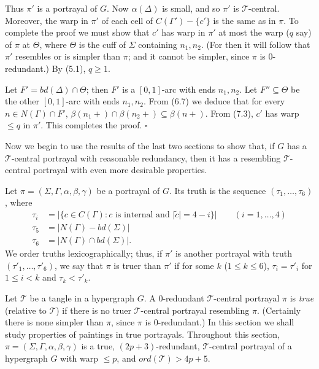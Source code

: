Thus $\pi'$ is a portrayal of $G$. Now $\alpha(\Delta)$ is small, and so $\pi'$ is $\mathcal{T}$-central. Moreover, the warp in $\pi'$ of each cell of $C(\Gamma') - \{c'\}$ is the same as in $\pi$. To complete the proof we must show that $c'$ has warp in $\pi'$ at most the warp ($q$ say) of $\pi$ at $\Theta$, where $\Theta$ is the cuff of $\Sigma$ containing $n_1, n_2$. (For then it will follow that $\pi'$ resembles or is simpler than $\pi$; and it cannot be simpler, since $\pi$ is $0$-redundant.) By (5.1), $q \ge 1$.

Let $F' = bd(\Delta) \cap \Theta$; then $F'$ is a $[0, 1]$-arc with ends $n_1, n_2$. Let $F'' \subseteq \Theta$ be the other $[0, 1]$-arc with ends $n_1, n_2$. From (6.7) we deduce that for every $n \in N(\Gamma) \cap F'$, $\beta(n_1+) \cap \beta(n_2+) \subseteq \beta(n+)$. From (7.3), $c'$ has warp $\le q$ in $\pi'$. This completes the proof. $\square$


Now we begin to use the results of the last two sections to show that, if $G$ has a $\mathcal{T}$-central portrayal with reasonable redundancy, then it has a resembling $\mathcal{T}$-central portrayal with even more desirable properties.

Let $\pi = (\Sigma, \Gamma, \alpha, \beta, \gamma)$ be a portrayal of $G$. Its truth is the sequence $(\tau_1, \dots, \tau_6)$, where
\begin{align*}
\tau_i &= |\{c \in C(\Gamma): c \text{ is internal and } |\tilde{c}| = 4 - i\}| \qquad (i = 1, \dots, 4) \\
\tau_5 &= |N(\Gamma) - bd(\Sigma)| \\
\tau_6 &= |N(\Gamma) \cap bd(\Sigma)|.
\end{align*}
We order truths lexicographically; thus, if $\pi'$ is another portrayal with truth $(\tau'_1, \dots, \tau'_6)$, we say that $\pi$ is truer than $\pi'$ if for some $k$ ($1 \le k \le 6$), $\tau_i = \tau'_i$ for $1 \le i < k$ and $\tau_k < \tau'_k$.

Let $\mathcal{T}$ be a tangle in a hypergraph $G$. A $0$-redundant $\mathcal{T}$-central portrayal $\pi$ is \textit{true} (relative to $\mathcal{T}$) if there is no truer $\mathcal{T}$-central portrayal resembling $\pi$. (Certainly there is none simpler than $\pi$, since $\pi$ is $0$-redundant.) In this section we shall study properties of paintings in true portrayals. Throughout this section, $\pi = (\Sigma, \Gamma, \alpha, \beta, \gamma)$ is a true, $(2p+3)$-redundant, $\mathcal{T}$-central portrayal of a hypergraph $G$ with warp $\le p$, and $ord(\mathcal{T}) > 4p+5$.


